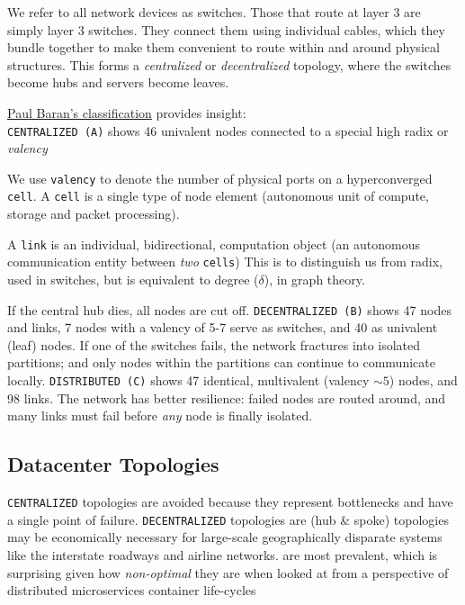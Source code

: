 \documentclass[../HFT-main.tex]{subfiles}
\begin{document}
We refer to all network devices as switches. Those that route at layer 3 are simply layer 3 switches.
They connect them using individual cables, which they bundle together to make them convenient to route within and around physical structures. This forms a \emph{centralized} or \emph{decentralized}%
 topology, where the switches become hubs and servers become leaves.
 
\noindent \href{http://www.rand.org/about/history/baran.html}{Paul Baran's classification} %
provides insight:\\ \texttt{CENTRALIZED (A)} shows 46 univalent nodes connected to a %
special high radix or \emph{valency}

We use \texttt{valency} to denote the number of physical ports on a hyperconverged \texttt{cell}. A \texttt{cell} is a single type of node element (autonomous unit of compute, storage and packet processing). 

A \texttt{link} is an individual, bidirectional, computation object (an autonomous communication entity between  \emph{two} \texttt{cells}) This is to distinguish us from radix, used in switches, but is equivalent to degree ($\delta$), in graph theory.

If the central hub dies, all nodes are cut off.  \texttt{DECENTRALIZED (B)} shows 47 nodes and links, 7 nodes with a valency of  5-7 serve as switches, and 40 as univalent (leaf) nodes. If one of the switches fails, the network fractures into isolated partitions; and only nodes within the partitions can continue to communicate locally. \texttt{DISTRIBUTED (C)} shows 47 identical, multivalent (valency $\sim5$) nodes, and 98 links. The network has better resilience:  failed nodes are routed around, and many links must fail before \emph{any} node is finally isolated.

\vspace{-8pt}
\subsection*{Datacenter Topologies}
\texttt{CENTRALIZED} topologies are avoided because they represent bottlenecks and have a single point of failure. %
\texttt{DECENTRALIZED} topologies are (hub \& spoke) topologies may be economically necessary for large-scale geographically disparate systems like the interstate roadways and airline networks. are  
most prevalent,  which is surprising given how \emph{non-optimal} they are  when looked at
from a perspective of distributed microservices container life-cycles
\end{document}
